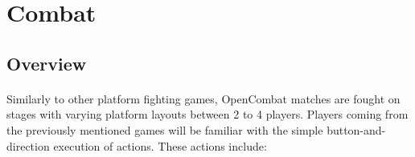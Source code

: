 \section{Combat}

\subsection{Overview}

\paragraph{} Similarly to other platform fighting games, OpenCombat matches are fought on stages with varying platform layouts between 2 to 4 players. Players coming from the previously mentioned games will be familiar with the simple button-and-direction execution of actions. These actions include:

